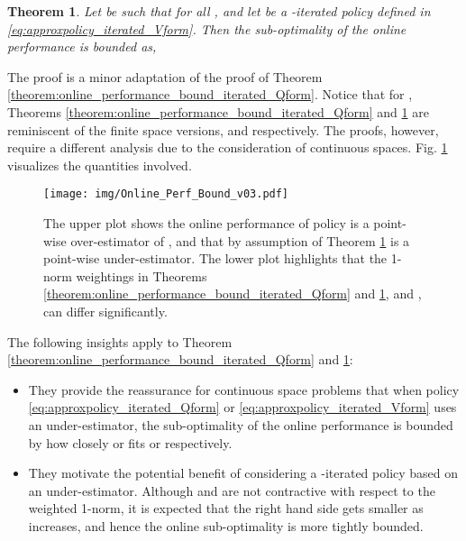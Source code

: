 \documentclass[journal]{IEEEtran}
\newtheorem{theorem}{Theorem}[section]
\begin{document}
\vspace{0.2cm}

\begin{theorem} \label{theorem:online_performance_bound_iterated_Vform}
	Let  be such that  for all , and let  be a -iterated policy defined in \eqref{eq:approxpolicy_iterated_Vform}. Then the sub-optimality of the online performance is bounded as,
	
\end{theorem}
\vspace{0.1cm}
The proof is a minor adaptation of the proof of Theorem \ref{theorem:online_performance_bound_iterated_Qform}.
Notice that for , Theorems \ref{theorem:online_performance_bound_iterated_Qform} and \ref{theorem:online_performance_bound_iterated_Vform} are reminiscent of the finite space versions, \cite[Theorem 1]{vanroy_decentADP} and \cite[Theorem 1]{vanRoy_linApproxDP} respectively. The proofs, however, require a different analysis due to the consideration of continuous spaces.
Fig. \ref{fig:online_bound_visualisation} visualizes the quantities involved.

\begin{figure}[t]
	\centering
	\texttt{[image: img/Online\_Perf\_Bound\_v03.pdf]}
	\caption[Visualizing the components of the online performance bound]
	{
		The upper plot shows the online performance of policy  is a point-wise over-estimator of , and that by assumption of Theorem \ref{theorem:online_performance_bound_iterated_Vform}  is a point-wise under-estimator. The lower plot highlights that the 1-norm weightings in Theorems \ref{theorem:online_performance_bound_iterated_Qform} and \ref{theorem:online_performance_bound_iterated_Vform},  and , can differ significantly.
	}
	\label{fig:online_bound_visualisation}
\end{figure}


The following insights apply to Theorem \ref{theorem:online_performance_bound_iterated_Qform} and \ref{theorem:online_performance_bound_iterated_Vform}:
\begin{itemize}
	\item They provide the reassurance for continuous space problems that when policy \eqref{eq:approxpolicy_iterated_Qform} or \eqref{eq:approxpolicy_iterated_Vform} uses an under-estimator, the sub-optimality of the online performance is bounded by how closely  or  fits  or  respectively.
	
	\item They motivate the potential benefit of considering a -iterated policy based on an under-estimator. Although  and  are not contractive with respect to the weighted 1-norm, it is expected that the right hand side gets smaller as  increases, and hence the online sub-optimality is more tightly bounded.
\end{itemize}
\end{document}
